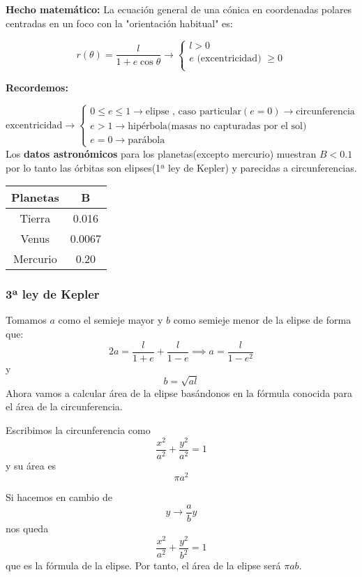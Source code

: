 \textbf{Hecho matemático:} La ecuación general de una cónica en coordenadas polares centradas en un foco con la "orientación habitual" es:

$$r(\theta) = \frac{l}{1+e\cos\theta} \rightarrow
\begin{cases}
l>0\\
e\text{ (excentricidad) }\ge0\\
\end{cases}
$$

\textbf{Recordemos:}

$$\text{excentricidad} \rightarrow
\begin{cases}
0 \le e \le 1 \rightarrow \text{elipse , caso particular} (e=0) \rightarrow \text{circunferencia}\\
e>1 \rightarrow \text{hipérbola(masas no capturadas por el sol)}\\
e=0 \rightarrow \text{parábola}
\end{cases}
$$
Los \textbf{datos astronómicos} para los planetas(excepto mercurio) muestran $B<0.1$ por lo tanto las órbitas son elipses(1ª ley de Kepler) y parecidas a circunferencias.

\begin{center}
\begin{tabular}{| c | c |}
	\hline
	Planetas & B \\
	\hline
	Tierra & 0.016 \\
	\hline
	Venus & 0.0067 \\
	\hline
	Mercurio & 0.20\\
	\hline
\end{tabular}
\end{center}


\subsubsection{3ª ley de Kepler}
Tomamos $a$ como el semieje mayor y $b$ como semieje menor de la elipse de forma que:
$$2a = \frac{l}{1+e} + \frac{l}{1-e} \implies a= \frac{l}{1-e^2}$$
y
$$b = \sqrt{al}$$
Ahora vamos a calcular área de la elipse basándonos en la fórmula conocida para el área de la circunferencia.

Escribimos la circunferencia como
\[\frac{x^2}{a^2} + \frac{y^2}{a^2} = 1\]
y su área es
\[\pi a^2\]

Si hacemos en cambio de
\[y \rightarrow \frac{a}{b}y\]
nos queda
\[\frac{x^2}{a^2} + \frac{y^2}{b^2} = 1\]
que es la fórmula de la elipse. Por tanto, el área de la elipse será $\pi ab$.

